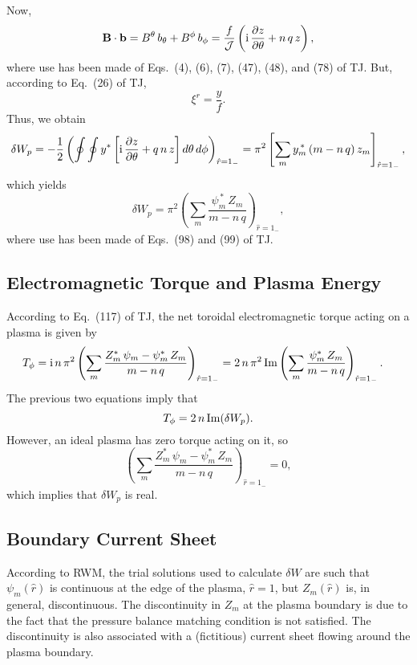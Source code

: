 \documentclass[12pt,prb,aps,notitlepage]{revtex4-1}
\begin{document}
Now, 
\begin{equation}
{\bf B}\cdot{\bf b} = B^\theta\,b_\theta+B^\phi\,b_\phi = \frac{f}{{\cal J}}\left({\rm i}\,\frac{\partial z}{\partial \theta} + n\,q\,z\right),
\end{equation}
where use has been made of Eqs.~(4), (6), (7), (47), (48), and (78) of TJ.
But, according to Eq.~(26) of TJ,
\begin{equation}
\xi^r = \frac{y}{f}.
\end{equation}
Thus, we obtain
\begin{equation}
\delta W_p = -\frac{1}{2}\left(\oint\oint y^\ast\left[{\rm i}\,\frac{\partial z}{\partial \theta}+q\,n\,z\right]d\theta\,d\phi\right)_{\hat{r}=1_{-}}=
\pi^2\left[\sum_m y_m^{\,\ast}\,(m-n\,q)\,z_m\right]_{\hat{r}=1_{-}},
\end{equation}
which yields 
\begin{equation}
\delta W_p  = \pi^2\left(\sum_m \frac{\psi_m^{\,\ast}\,Z_m}{m-n\,q}\right)_{\hat{r}=1_{-}},
\end{equation}
where use has been made of Eqs.~(98) and (99) of TJ.

\subsection{Electromagnetic Torque and Plasma Energy}
According to Eq.~(117) of TJ, the net toroidal electromagnetic torque acting on a plasma is given by
\begin{align}
T_\phi&={\rm i}\,n\,\pi^2\left(\sum_m\frac{Z_m^\ast\,\psi_m-\psi_m^\ast\,Z_m}{m-n\,q}\right)_{\hat{r}=1_{-}}
=2\,n\,\pi^2\,{\rm Im}\left(\sum_m\frac{\psi_m^\ast\,Z_m}{m-n\,q}\right)_{\hat{r}=1_{-}}.
\end{align}
The previous two equations imply that
\begin{equation}
T_\phi = 2\,n\,{\rm Im}(\delta W_p).
\end{equation}
However, an ideal plasma has zero torque acting on it, so 
\begin{equation}
\left(\sum_m\frac{Z_m^\ast\,\psi_m-\psi_m^\ast\,Z_m}{m-n\,q}\right)_{\hat{r}=1_{-}}=0,
\end{equation}
which implies that $\delta W_p$ is real. 

\subsection{Boundary Current Sheet}
According to RWM, the trial solutions used to calculate $\delta W$ are such that  $\psi_m(\hat{r})$ is continuous at the edge of the plasma, $\hat{r}=1$, 
but $Z_m(\hat{r})$ is, in general, discontinuous. The discontinuity in $Z_m$ at the plasma boundary is due to the fact that the pressure balance
matching condition is not satisfied. The discontinuity is also associated with a (fictitious) current sheet flowing around the plasma boundary.
\end{document}
